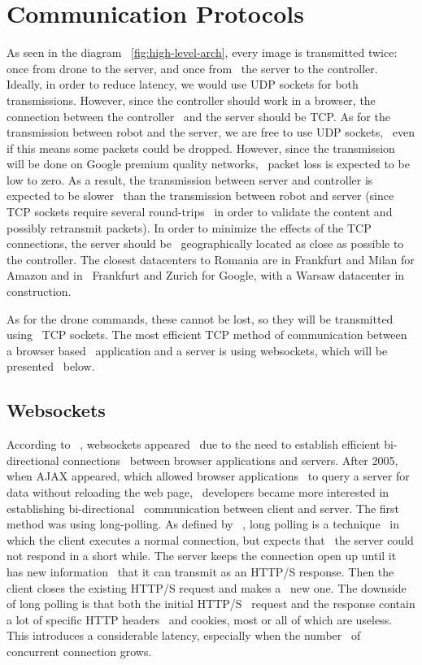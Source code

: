 \section{Communication Protocols}
\label{sec:analysis-comms-protocols}
As seen in the diagram ~\ref{fig:high-level-arch},
every image is transmitted twice: once from drone to the server, and once from \
the server to the controller.
Ideally, in order to reduce latency, we would use UDP sockets for both transmissions.
However, since the controller should work in a browser, the connection between the controller \
and the server should be TCP.
As for the transmission between robot and the server, we are free to use UDP sockets, \
even if this means some packets could be dropped.
However, since the transmission will be done on Google premium quality networks, \
packet loss is expected to be low to zero.
As a result, the transmission between server and controller is expected to be slower \
than the transmission between robot and server (since TCP sockets require several round-trips \
in order to validate the content and possibly retransmit packets).
In order to minimize the effects of the TCP connections, the server should be \
geographically located as close as possible to the controller.
The closest datacenters to Romania are in Frankfurt and Milan for Amazon and in \
Frankfurt and Zurich for Google, with a Warsaw datacenter in construction.

As for the drone commands, these cannot be lost, so they will be transmitted using \
TCP sockets.
The most efficient TCP method of communication between a browser based \
application and a server is using websockets, which will be presented \
below.

\subsection{Websockets}
\label{subsec:analysis-websockets}
According to ~\cite{TeamTreeHouseWebSockets}, websockets appeared \
due to the need to establish efficient bi-directional connections \
between browser applications and servers.
After 2005, when AJAX appeared, which allowed browser applications \
to query a server for data without reloading the web page, \
developers became more interested in establishing bi-directional \
communication between client and server.
The first method was using long-polling.
As defined by ~\cite{WikiLongPolling}, long polling is a technique \
in which the client executes a normal connection, but expects that \
the server could not respond in a short while.
The server keeps the connection open up until it has new information \
that it can transmit as an HTTP/S response.
Then the client closes the existing HTTP/S request and makes a \
new one.
The downside of long polling is that both the initial HTTP/S \
request and the response contain a lot of specific HTTP headers \
and cookies, most or all of which are useless.
This introduces a considerable latency, especially when the number \
of concurrent connection grows.

